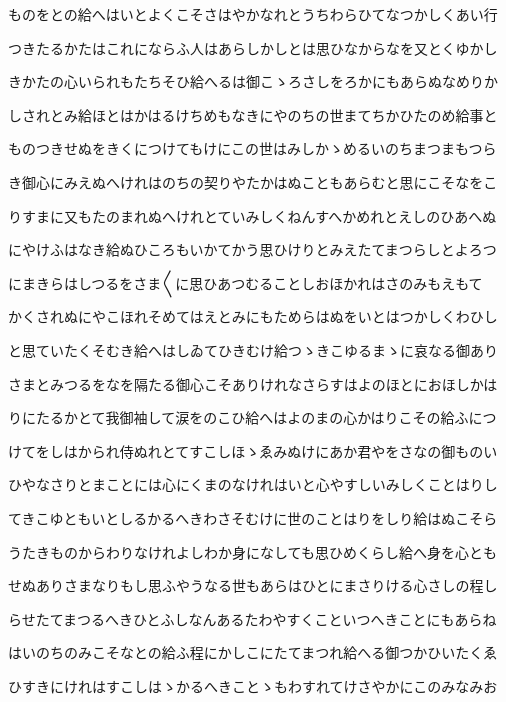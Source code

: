 \documentclass[a4paper,11pt,landscape]{ltjtarticle}
\begin{document}
\par\medskip
ものをとの給へはいとよくこそさはやかなれとうちわらひてなつかしくあい行
\par\medskip
つきたるかたはこれにならふ人はあらしかしとは思ひなからなを又とくゆかし
\par\medskip
きかたの心いられもたちそひ給へるは御こゝろさしをろかにもあらぬなめりか
\par\medskip
しされとみ給ほとはかはるけちめもなきにやのちの世まてちかひたのめ給事と
\par\medskip
ものつきせぬをきくにつけてもけにこの世はみしかゝめるいのちまつまもつら
\par\medskip
き御心にみえぬへけれはのちの契りやたかはぬこともあらむと思にこそなをこ
\par\medskip
りすまに又もたのまれぬへけれとていみしくねんすへかめれとえしのひあへぬ
\par\medskip
にやけふはなき給ぬひころもいかてかう思ひけりとみえたてまつらしとよろつ
\par\medskip
にまきらはしつるをさま〱に思ひあつむることしおほかれはさのみもえもて
\par\medskip
かくされぬにやこほれそめてはえとみにもためらはぬをいとはつかしくわひし
\par\medskip
と思ていたくそむき給へはしゐてひきむけ給つゝきこゆるまゝに哀なる御あり
\par\medskip
さまとみつるをなを隔たる御心こそありけれなさらすはよのほとにおほしかは
\par\medskip
りにたるかとて我御袖して涙をのこひ給へはよのまの心かはりこその給ふにつ
\par\medskip
けてをしはかられ侍ぬれとてすこしほゝゑみぬけにあか君やをさなの御ものい
\par\medskip
ひやなさりとまことには心にくまのなけれはいと心やすしいみしくことはりし
\par\medskip
てきこゆともいとしるかるへきわさそむけに世のことはりをしり給はぬこそら
\par\medskip
うたきものからわりなけれよしわか身になしても思ひめくらし給へ身を心とも
\par\medskip
せぬありさまなりもし思ふやうなる世もあらはひとにまさりける心さしの程し
\par\medskip
らせたてまつるへきひとふしなんあるたわやすくこといつへきことにもあらね
\par\medskip
はいのちのみこそなとの給ふ程にかしこにたてまつれ給へる御つかひいたくゑ
\par\medskip
ひすきにけれはすこしはゝかるへきことゝもわすれてけさやかにこのみなみお
\end{document}
